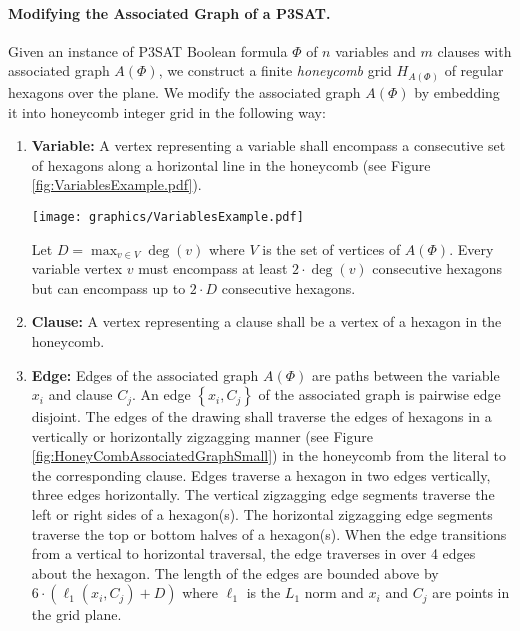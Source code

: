 \documentclass[10pt]{CSUNthesis}
\theoremstyle{plain}%
\theoremstyle{definition}
\theoremstyle{remark}
\newcommand{\lr}[1]{\left( #1 \right)}
\begin{document}
\paragraph{Modifying the Associated Graph of a P3SAT.}

Given an instance of P3SAT Boolean formula $\Phi$ of $n$ variables and $m$ clauses with associated graph $A(\Phi)$, we construct a finite \textit{honeycomb} grid $H_{A \lr{\Phi}}$ of regular hexagons over the plane.
We modify the associated graph $A\lr{\Phi}$ by embedding it into honeycomb integer grid in the following way:

\begin{enumerate}
\item \textbf{Variable:} A vertex representing a variable shall encompass a consecutive set of hexagons along a horizontal line in the honeycomb (see Figure \ref{fig:VariablesExample.pdf}).

\begin{minipage}{\linewidth}
\begin{center}
\texttt{[image: graphics/VariablesExample.pdf]}
\label{fig:VariablesExample.pdf}
\end{center}
\end{minipage}

Let $D = \max_{v \in V} \deg(v)$ where $V$ is the set of vertices of $A(\Phi)$.
Every variable vertex $v$  must encompass at least $2 \cdot \deg(v)$ consecutive hexagons but can encompass up to $2 \cdot D$ consecutive hexagons.
\item \textbf{Clause:} A vertex representing a clause shall be a vertex of a hexagon in the honeycomb.
\item \textbf{Edge:} Edges of the associated graph $A(\Phi)$ are paths between the variable $x_i$ and clause $C_j$.  An edge $\left\lbrace x_i, C_j \right\rbrace$ of the associated graph is pairwise edge disjoint. 
The edges of the drawing shall traverse the edges of hexagons in a vertically or horizontally zigzagging manner (see Figure \ref{fig:HoneyCombAssociatedGraphSmall}) in the honeycomb from the literal to the corresponding clause. 
Edges traverse a hexagon in two edges vertically, three edges horizontally.  
The vertical zigzagging edge segments traverse the left or right sides of a hexagon(s).
The horizontal zigzagging edge segments traverse the top or bottom halves of a hexagon(s).
When the edge transitions from a vertical to horizontal traversal, the edge traverses in over 4 edges about the hexagon.
The length of the edges are bounded above by $6 \cdot \lr{\ell_1 \lr{x_i,C_j} + D}$ where $\ell_1$ is the $L_1$ norm and $x_i$ and $C_j$ are points in the grid plane. 
\end{enumerate}
\end{document}
